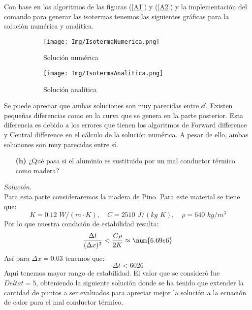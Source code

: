 \documentclass[11pt]{article}
\begin{document}
	Con base en los algoritmos de las figuras (\ref{A1}) y (\ref{A2}) y la implementación del comando para generar las isotermas tenemos las siguientes gráficas para la solución numérica y analítica.

\newpage
	\begin{figure}[htp!]
		\begin{subfigure}[b]{0.48\textwidth}
			\centering
			\texttt{[image: Img/IsotermaNumerica.png]}
			\caption{Solución numérica}
			\label{}
		\end{subfigure}
		\hfill
		\begin{subfigure}[b]{0.48\textwidth}
			\centering
			\texttt{[image: Img/IsotermaAnalitica.png]}
			\caption{Solución analítica}
			\label{}
		\end{subfigure}
		\caption{}
		\label{}
	\end{figure}
	
	Se puede apreciar que ambas soluciones son muy parecidas entre sí. Existen pequeñas diferencias como en la curva que se genera en la parte posterior. Esta diferencia es debido a los errores que tienen los algoritmos de Forward difference y Central difference en el cálculo de la solución numérica. A pesar de ello, ambas soluciones son muy parecidas entre sí. 

\begin{enumerate}
	\item [\textbf{(h)}] ¿Qué pasa si el aluminio es sustituido por un mal conductor térmico
	como madera?
\end{enumerate}
\textit{Solución.}\\	
	Para esta parte consideraremos la madera de Pino. Para este material se tiene que:
	\begin{equation}
		K = 0.12\,\, \si{W/(m\cdot K)},\quad C = 2510\,\, \si{J/(kg\,\, K)},\quad \rho = 640 \,\,\si{kg/m^3}	\label{valoresmadera}
	\end{equation}
	Por lo que nuestra condición de estabilidad resulta:
	\begin{align*}
			\frac{\Delta t}{(\Delta x)^2} < \frac{C\rho}{2 K } \approx \num{6.69e 6}	
	\end{align*} 
	Así para $\Delta x = 0.03$ tenemos que:
	$$\Delta t < 6026$$
	Aquí tenemos mayor rango de estabilidad. El valor que se consideró fue $Delta t= 5$, obteniendo la siguiente solución donde se ha tenido que extender la cantidad de puntos a ser evaluados para apreciar mejor la solución a la ecuación de calor para el mal conductor térmico.
\newpage
	
\end{document}
